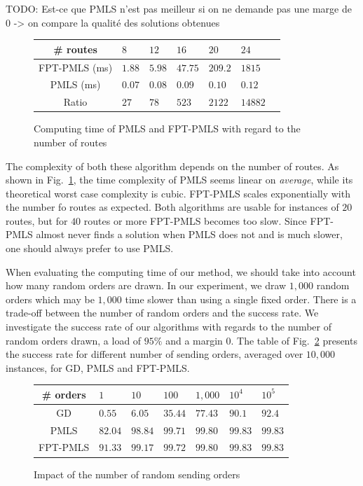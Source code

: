 \documentclass[a4paper,10pt]{article}
\newcommand{\todo}[1]{{\color{red} TODO: {#1}}}
\begin{document}
     \todo{Est-ce que PMLS n'est pas meilleur si on ne demande pas une marge de 0 -> on compare la 
     qualité des solutions obtenues}
     
          \begin{figure}[h] 
       \begin{center}
   \begin{tabularx}{0.5\textwidth}{|c|X|X|X|X|X|X|}
    \hline
    \# routes& $8$ & $12$ & $16$& $20$ & $24$\\
    \hline
    FPT-PMLS (ms) & $1.88$ &$5.98$&$47.75$&$209.2$&$1815$\\
    \hline
     PMLS (ms) & $0.07$ &$0.08$&$0.09$&$0.10$&$0.12$\\
    \hline
 Ratio & $27$ &$78$&$523$&$2122$&$14882$\\
    \hline
      \end{tabularx}
      \end{center}
   \caption{Computing time of PMLS and FPT-PMLS with regard to the number of routes}
        \label{fig:tps_fpt}
     \end{figure}
    
  The complexity of both these algorithm depends on the number of routes. As shown in Fig.~\ref{fig:tps_fpt}, the time complexity of PMLS seems linear on \emph{average}, while its theoretical worst case complexity is cubic. FPT-PMLS scales exponentially with the number fo routes as expected. Both algorithms are usable for instances of $20$ routes, but for $40$ routes or more FPT-PMLS becomes too slow. Since FPT-PMLS almost never finds a solution when PMLS does not and is much slower, one should always prefer to use PMLS. 

    When evaluating the computing time of our method, we should take into account how many random orders are drawn. In our experiment, we draw $1,000$ random orders which may be $1,000$ time slower than using a single fixed order. There is a trade-off between the number of random orders and the success rate. 
    We investigate the success rate of our algorithms with regards to the number of random orders drawn, a load of $95\%$ and a margin $0$. The table of Fig.~\ref{fig:randomdrawing} presents the success rate for different number of sending orders, averaged over $10,000$ instances, for GD, PMLS and FPT-PMLS.

         \begin{figure}[h] 
       \begin{center}
   \begin{tabularx}{0.5\textwidth}{|c|X|X|X|X|X|X|}
    \hline
    \# orders& $1$ & $10$ & $100$& $1,000$& $10^{4}$&$10^{5}$\\
    \hline
    GD & $0.55$ &$6.05$&$35.44$&$77.43$&$90.1$&$92.4$\\
    \hline
  PMLS & $82.04$ &$98.84$&$99.71$&$99.80$&$99.83$&$99.83$\\
    \hline
    FPT-PMLS & $91.33$&$99.17$&$99.72$&$99.80$ &$99.83$&$99.83$\\
    \hline
      \end{tabularx}
      \end{center}
   \caption{Impact of the number of random sending orders}
        \label{fig:randomdrawing}
     \end{figure}
\end{document}
